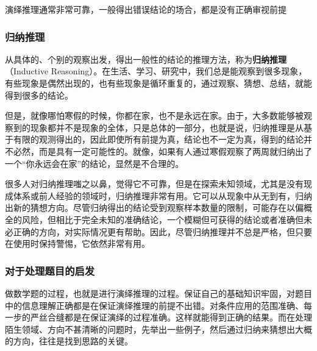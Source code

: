 演绎推理通常非常可靠，一般得出错误结论的场合，都是没有正确审视前提

\subsubsection{归纳推理}

从具体的、个别的观察出发，得出一般性的结论的推理方法，称为\textbf{归纳推理}（Inductive Reasoning）。在生活、学习、研究中，我们总是能观察到很多现象，有些现象是偶然出现的，也有些现象是循环重复的，通过观察、猜想、总结，就能得到很多的结论。

但是，就像哪怕寒假的时候，你都在家，也不是永远在家。由于，大多数能够被观察到的现象都并不是现象的全体，只是总体的一部分，也就是说，归纳推理是从基于有限的观测得出的，因此即使所有前提为真，结论也不一定为真，得到的结论并不必然，而是具有一定可能性的。就像，如果有人通过寒假观察了两周就归纳出了一个“你永远会在家”的结论，显然是不合理的。

很多人对归纳推理嗤之以鼻，觉得它不可靠，但是在探索未知领域，尤其是没有现成体系或前人经验的领域时，归纳推理非常有用。它可以从现象中从无到有，归纳出新的猜想方向。尽管归纳得出的结论受到观察样本数量的限制，可能存在以偏概全的风险，但相比于完全未知的准确结论，一个模糊但可获得的结论或者准确但未必正确的方向，对实际情况更有帮助。因此，尽管归纳推理并不总是严格，但只要在使用时保持警惕，它依然非常有用。

\subsubsection{对于处理题目的启发}

做数学题的过程，也就是进行演绎推理的过程。保证自己的基础知识牢固，对题目中的信息理解正确都是在保证演绎推理的前提不出错。对条件应用的范围准确、每一步的严丝合缝都是在保证演绎的过程准确。这样就能得到正确的结果。而在处理陌生领域、方向不甚清晰的问题时，先举出一些例子，然后通过归纳来猜想出大概的方向，往往是找到思路的关键。